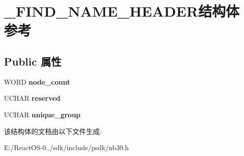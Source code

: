 \hypertarget{struct___f_i_n_d___n_a_m_e___h_e_a_d_e_r}{}\section{\+\_\+\+F\+I\+N\+D\+\_\+\+N\+A\+M\+E\+\_\+\+H\+E\+A\+D\+E\+R结构体 参考}
\label{struct___f_i_n_d___n_a_m_e___h_e_a_d_e_r}
\subsection*{Public 属性}
\begin{DoxyCompactItemize}
\item 
\mbox{\label{struct___f_i_n_d___n_a_m_e___h_e_a_d_e_r_a2ab1c5108562c787b153267f80a49520}} 
W\+O\+RD {\bfseries node\+\_\+count}
\item 
\mbox{\label{struct___f_i_n_d___n_a_m_e___h_e_a_d_e_r_a483f5f02385f6376c6a1af5fb30d5ecc}} 
U\+C\+H\+AR {\bfseries reserved}
\item 
\mbox{\label{struct___f_i_n_d___n_a_m_e___h_e_a_d_e_r_a943a380edbe473bc0f41f50dc15e4278}} 
U\+C\+H\+AR {\bfseries unique\+\_\+group}
\end{DoxyCompactItemize}


该结构体的文档由以下文件生成\+:\begin{DoxyCompactItemize}
\item 
E\+:/\+React\+O\+S-\/0../sdk/include/psdk/nb30.\+h\end{DoxyCompactItemize}

